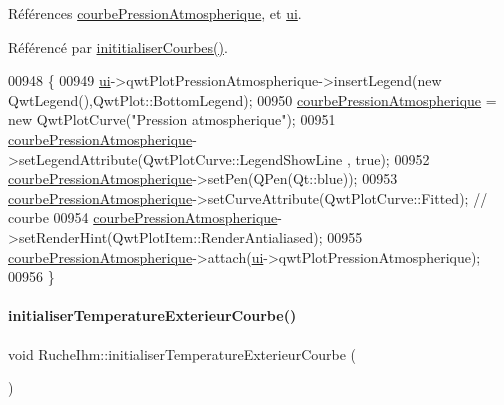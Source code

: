 Références \hyperlink{class_ruche_ihm_aa6685f1fc20aa4459eab3b0bb3c4d1ef}{courbe\+Pression\+Atmospherique}, et \hyperlink{class_ruche_ihm_a64786058bd7f88ca2f1e9743bb27c25b}{ui}.



Référencé par \hyperlink{class_ruche_ihm_a4fe15b22538611ad9ffc4d807f8b78fd}{inititialiser\+Courbes()}.


\begin{DoxyCode}
00948 \{
00949     \hyperlink{class_ruche_ihm_a64786058bd7f88ca2f1e9743bb27c25b}{ui}->qwtPlotPressionAtmospherique->insertLegend(\textcolor{keyword}{new} QwtLegend(),QwtPlot::BottomLegend);
00950     \hyperlink{class_ruche_ihm_aa6685f1fc20aa4459eab3b0bb3c4d1ef}{courbePressionAtmospherique} = \textcolor{keyword}{new} QwtPlotCurve(\textcolor{stringliteral}{"Pression atmospherique"});
00951     \hyperlink{class_ruche_ihm_aa6685f1fc20aa4459eab3b0bb3c4d1ef}{courbePressionAtmospherique}->setLegendAttribute(QwtPlotCurve::LegendShowLine
      , \textcolor{keyword}{true});
00952     \hyperlink{class_ruche_ihm_aa6685f1fc20aa4459eab3b0bb3c4d1ef}{courbePressionAtmospherique}->setPen(QPen(Qt::blue));
00953     \hyperlink{class_ruche_ihm_aa6685f1fc20aa4459eab3b0bb3c4d1ef}{courbePressionAtmospherique}->setCurveAttribute(QwtPlotCurve::Fitted); \textcolor{comment}{//
       courbe}
00954     \hyperlink{class_ruche_ihm_aa6685f1fc20aa4459eab3b0bb3c4d1ef}{courbePressionAtmospherique}->setRenderHint(QwtPlotItem::RenderAntialiased);
00955     \hyperlink{class_ruche_ihm_aa6685f1fc20aa4459eab3b0bb3c4d1ef}{courbePressionAtmospherique}->attach(\hyperlink{class_ruche_ihm_a64786058bd7f88ca2f1e9743bb27c25b}{ui}->qwtPlotPressionAtmospherique);
00956 \}
\end{DoxyCode}
\mbox{\label{class_ruche_ihm_adb1039cc926ceb318c5d851f09d896c1}} 
\paragraph{\texorpdfstring{initialiser\+Temperature\+Exterieur\+Courbe()}{initialiserTemperatureExterieurCourbe()}}
{\footnotesize\ttfamily void Ruche\+Ihm\+::initialiser\+Temperature\+Exterieur\+Courbe (\begin{DoxyParamCaption}{ }\end{DoxyParamCaption})\hspace{0.3cm}{\ttfamily [private]}}




